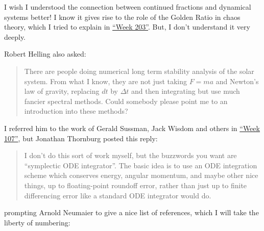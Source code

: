 \documentclass{article}
\begin{document}
I wish I understood the connection between continued fractions and
dynamical systems better! I know it gives rise to the role of the Golden
Ratio in chaos theory, which I tried to explain in
\protect\hyperlink{week203}{``Week 203''}. But, I don't understand it
very deeply.

Robert Helling also asked:

\begin{quote}
There are people doing numerical long term stability analysis of the
solar system. From what I know, they are not just taking \(F=ma\) and
Newton's law of gravity, replacing \(dt\) by \(\Delta t\) and then
integrating but use much fancier spectral methods. Could somebody please
point me to an introduction into these methods?
\end{quote}

I referred him to the work of Gerald Sussman, Jack Wisdom and others in
\protect\hyperlink{week107}{``Week 107''}, but Jonathan Thornburg posted
this reply:

\begin{quote}
I don't do this sort of work myself, but the buzzwords you want are
``symplectic ODE integrator''. The basic idea is to use an ODE
integration scheme which conserves energy, angular momentum, and maybe
other nice things, up to floating-point roundoff error, rather than just
up to finite differencing error like a standard ODE integrator would do.
\end{quote}

prompting Arnold Neumaier to give a nice list of references, which I
will take the liberty of numbering:
\end{document}
